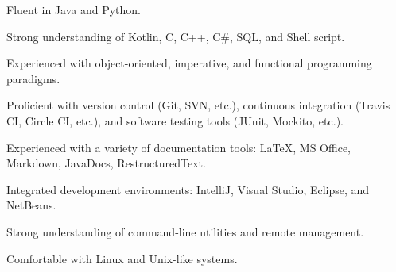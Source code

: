
\begin{cvskills}
    {
      \begin{cvitems}
        \item {Fluent in Java and Python.}
        \item {Strong understanding of Kotlin, C, C++, C\#, SQL, and Shell script.}
        \item {Experienced with object-oriented, imperative, and functional programming paradigms.}
      \end{cvitems}
    }

  {
    \begin{cvitems}
      \item {Proficient with version control (Git, SVN, etc.), continuous integration (Travis CI, Circle CI, etc.), and software testing tools (JUnit, Mockito, etc.).}
      \item {Experienced with a variety of documentation tools: LaTeX, MS Office, Markdown, JavaDocs, RestructuredText.}
    \end{cvitems}
  }

    {
      \begin{cvitems}
        \item {Integrated development environments: IntelliJ, Visual Studio, Eclipse, and NetBeans.}
        \item {Strong understanding of command-line utilities and remote management.}
        \item {Comfortable with Linux and Unix-like systems.}
      \end{cvitems}
    }

\end{cvskills}
